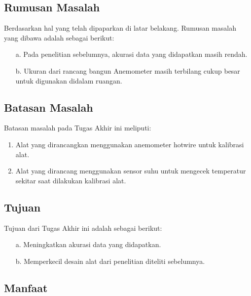 \subsection{Rumusan Masalah}

Berdasarkan hal yang telah dipaparkan di latar belakang. Rumusan masalah yang dibawa adalah sebagai berikut:
\begin{enumerate}
	\item[a.] Pada penelitian sebelumnya, akurasi data yang didapatkan masih rendah.
	\item[b.] Ukuran dari rancang bangun Anemometer masih terbilang cukup besar untuk digunakan didalam ruangan.
\end{enumerate}


\subsection{Batasan Masalah}

Batasan masalah pada Tugas Akhir ini meliputi:
\begin{enumerate}
	\item Alat yang dirancangkan menggunakan anemometer hotwire untuk kalibrasi alat.
	\item Alat yang dirancang menggunakan sensor suhu untuk mengecek temperatur sekitar saat dilakukan kalibrasi alat.
\end{enumerate}

\subsection{Tujuan}

Tujuan dari Tugas Akhir ini adalah sebagai berikut:
\begin{enumerate}
	\item[a.]	Meningkatkan akurasi data yang didapatkan.
	\item[b.]	Memperkecil desain alat dari penelitian diteliti sebelumnya.
\end{enumerate}

\subsection{Manfaat}

